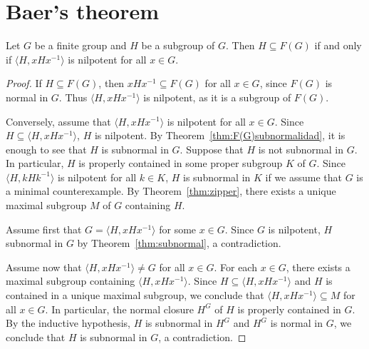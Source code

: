 
\section{Baer's theorem}

\begin{theorem}[Baer]
	\label{thm:Baer}
	Let $G$ be a finite group and $H$ be a subgroup of $G$. Then $H\subseteq
	F(G)$ if and only if $\langle H,xHx^{-1}\rangle$ is nilpotent for all 
	$x\in G$.
\end{theorem}

\begin{proof}
	If $H\subseteq F(G)$, then $xHx^{-1}\subseteq F(G)$ for all $x\in G$, since
	$F(G)$ is normal in $G$. Thus $\langle H,xHx^{-1}\rangle$ is nilpotent, as it
	is a subgroup of $F(G)$.

	Conversely, assume that $\langle H,xHx^{-1}\rangle$ is nilpotent for all  $x\in G$. Since $H\subseteq \langle H,xHx^{-1}\rangle$, $H$ is nilpotent. By
	Theorem~\ref{thm:F(G)subnormalidad}, it is enough to see that $H$ is subnormal
	in $G$. Suppose that $H$ is not subnormal in
	$G$. In particular, $H$ is properly contained in some proper subgroup $K$ of $G$. Since $\langle
	H,kHk^{-1}\rangle$ is nilpotent for all $k\in K$, $H$ is subnormal in $K$ if we assume that $G$ is a minimal counterexample. 
	By Theorem~\ref{thm:zipper}, there exists a unique
	maximal subgroup $M$ of $G$ containing $H$. 
    
    Assume first that $G=\langle H,xHx^{-1}\rangle$ for some $x\in G$. Since $G$
    is nilpotent, $H$ subnormal in $G$ by Theorem~\ref{thm:subnormal}, a
    contradiction. 

    Assume now that $\langle H,xHx^{-1}\rangle\ne G$ for all $x\in G$. For each 
	$x\in G$, there exists a maximal subgroup containing $\langle
	H,xHx^{-1}\rangle$. Since $H\subseteq \langle H,xHx^{-1}\rangle$ and $H$
	is contained in a unique maximal subgroup, we conclude that $\langle
	H,xHx^{-1}\rangle\subseteq M$ for all $x\in G$. In particular, the normal closure 
	$H^G$ of $H$ is properly contained in $G$. By the inductive hypothesis, 
	$H$ is subnormal in $H^G$ and $H^G$ is normal in $G$, we conclude that 
	$H$ is subnormal in $G$, a contradiction. 
\end{proof}

